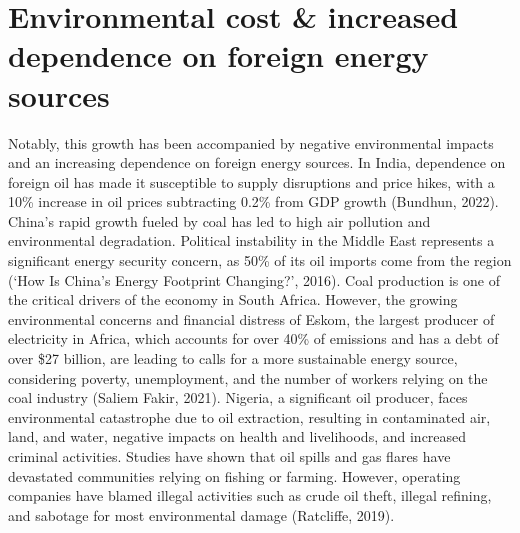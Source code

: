 \documentclass[12pt,a4paper]{article}
\begin{document}
\section*{Environmental cost \& increased dependence on foreign energy sources}
Notably, this growth has been accompanied by negative environmental impacts and an increasing dependence on foreign energy sources. In India, dependence on foreign oil has made it susceptible to supply disruptions and price hikes, with a 10\% increase in oil prices subtracting 0.2\% from GDP growth (Bundhun, 2022). China's rapid growth fueled by coal has led to high air pollution and environmental degradation. Political instability in the Middle East represents a significant energy security concern, as 50\% of its oil imports come from the region (`How Is China's Energy Footprint Changing?', 2016). Coal production is one of the critical drivers of the economy in South Africa. However, the growing environmental concerns and financial distress of Eskom, the largest producer of electricity in Africa, which accounts for over 40\% of emissions and has a debt of over \$27 billion, are leading to calls for a more sustainable energy source, considering poverty, unemployment, and the number of workers relying on the coal industry (Saliem Fakir, 2021). Nigeria, a significant oil producer, faces environmental catastrophe due to oil extraction, resulting in contaminated air, land, and water, negative impacts on health and livelihoods, and increased criminal activities. Studies have shown that oil spills and gas flares have devastated communities relying on fishing or farming. However, operating companies have blamed illegal activities such as crude oil theft, illegal refining, and sabotage for most environmental damage (Ratcliffe, 2019). 
\end{document}

